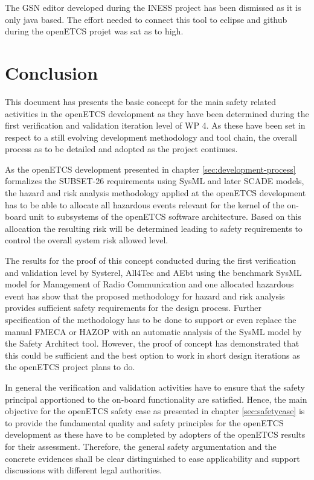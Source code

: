 \documentclass{template/openetcs_report}
\begin{document}
The GSN editor developed during the INESS project has been dismissed as it is only java based. The effort needed to connect this tool to eclipse and github during the openETCS projet was sat as to high. 
 
\chapter{Conclusion}
\label{sec:conclusion}

This document has presents the basic concept for the main safety related activities in the openETCS development as they have been determined during the first verification and validation iteration level of WP 4. As these have been set in respect to a still evolving development methodology and tool chain, the overall process as to be detailed and adopted as the project continues. 

As the openETCS development presented in chapter \ref{sec:development-process} formalizes the SUBSET-26 requirements using SysML and later SCADE models, the hazard and risk analysis methodology applied at the openETCS development has to be able to allocate all hazardous events relevant for the kernel of the on-board unit to subsystems of the openETCS software architecture. Based on this allocation the resulting risk will be determined leading to safety requirements to control the overall system risk allowed level. 

The results for the proof of this concept conducted during the first verification and validation level by Systerel, All4Tec and AEbt using the benchmark SysML model for Management of Radio Communication and one allocated hazardous event has show that the proposed methodology for hazard and risk analysis provides sufficient safety requirements for the design process. Further specification of the methodology has to be done to support or even replace the manual FMECA or HAZOP with an automatic analysis of the SysML model by the Safety Architect tool. However, the proof of concept has demonstrated that this could be sufficient and the best option to work in short design iterations as the openETCS project plans to do. 

In general the verification and validation activities have to ensure that the safety principal apportioned to the on-board functionality are satisfied. Hence, the main objective for the openETCS safety case as presented in chapter \ref{sec:safetycase} is to provide the fundamental quality and safety principles for the openETCS development as these have to be completed by adopters of the openETCS results for their assessment. Therefore, the general safety argumentation and the concrete evidences shall be clear distinguished to ease applicability and support discussions with different legal authorities.
\end{document}
